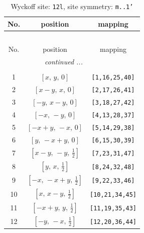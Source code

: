 \documentclass[fleqn,8pt]{jsarticle}
\begin{document}
\begin{longtable}{ccc}
\caption{Wyckoff site: {\tt 12l}, site symmetry: {\tt m..1'}}
 \\
 \hline \hline
No. & position & mapping \\ \hline \endfirsthead

\multicolumn{2}{l}{\tablename\ \thetable{}} \\
 \hline \hline
No. & position & mapping \\ \hline \endhead

 \hline \hline
\multicolumn{2}{r}{\footnotesize\it continued ...} \\ \endfoot

 \hline \hline
\multicolumn{2}{r}{} \\ \endlastfoot

1 & $\left[ x,\, y,\, 0 \right]$ & {\tt [1,16,25,40]} \\ \hline
2 & $\left[ x - y,\, x,\, 0 \right]$ & {\tt [2,17,26,41]} \\ \hline
3 & $\left[ - y,\, x - y,\, 0 \right]$ & {\tt [3,18,27,42]} \\ \hline
4 & $\left[ - x,\, - y,\, 0 \right]$ & {\tt [4,13,28,37]} \\ \hline
5 & $\left[ - x + y,\, - x,\, 0 \right]$ & {\tt [5,14,29,38]} \\ \hline
6 & $\left[ y,\, - x + y,\, 0 \right]$ & {\tt [6,15,30,39]} \\ \hline
7 & $\left[ x - y,\, - y,\, \frac{1}{2} \right]$ & {\tt [7,23,31,47]} \\ \hline
8 & $\left[ y,\, x,\, \frac{1}{2} \right]$ & {\tt [8,24,32,48]} \\ \hline
9 & $\left[ - x,\, - x + y,\, \frac{1}{2} \right]$ & {\tt [9,22,33,46]} \\ \hline
10 & $\left[ x,\, x - y,\, \frac{1}{2} \right]$ & {\tt [10,21,34,45]} \\ \hline
11 & $\left[ - x + y,\, y,\, \frac{1}{2} \right]$ & {\tt [11,19,35,43]} \\ \hline
12 & $\left[ - y,\, - x,\, \frac{1}{2} \right]$ & {\tt [12,20,36,44]} \\
\end{longtable}
\renewcommand{\arraystretch}{1.2}
\end{document}
